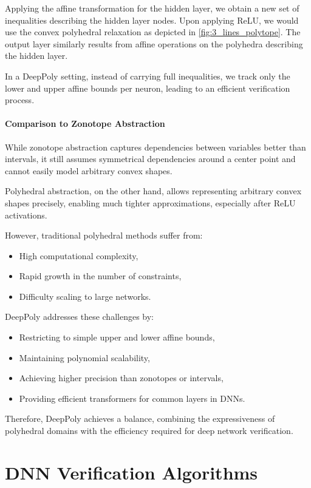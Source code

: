 \documentclass[oneside,11pt,dvipsnames]{book}
\numberwithin{equation}{section}
\theoremstyle{definition}
\theoremstyle{remark}
\begin{document}
Applying the affine transformation for the hidden layer, we obtain a new set of inequalities describing the hidden layer nodes. Upon applying ReLU, we would use the convex polyhedral relaxation as depicted in \autoref{fig:3_lines_polytope}. The output layer similarly results from affine operations on the polyhedra describing the hidden layer.

In a DeepPoly setting, instead of carrying full inequalities, we track only the lower and upper affine bounds per neuron, leading to an efficient verification process.

\subsection{Comparison to Zonotope Abstraction}

While zonotope abstraction captures dependencies between variables better than intervals, it still assumes symmetrical dependencies around a center point and cannot easily model arbitrary convex shapes.

Polyhedral abstraction, on the other hand, allows representing arbitrary convex shapes precisely, enabling much tighter approximations, especially after ReLU activations.

However, traditional polyhedral methods suffer from:
\begin{itemize}
    \item High computational complexity,
    \item Rapid growth in the number of constraints,
    \item Difficulty scaling to large networks.
\end{itemize}

DeepPoly addresses these challenges by:
\begin{itemize}
    \item Restricting to simple upper and lower affine bounds,
    \item Maintaining polynomial scalability,
    \item Achieving higher precision than zonotopes or intervals,
    \item Providing efficient transformers for common layers in DNNs.
\end{itemize}

Therefore, DeepPoly achieves a balance, combining the expressiveness of polyhedral domains with the efficiency required for deep network verification.




\part{DNN Verification Algorithms}
\end{document}
